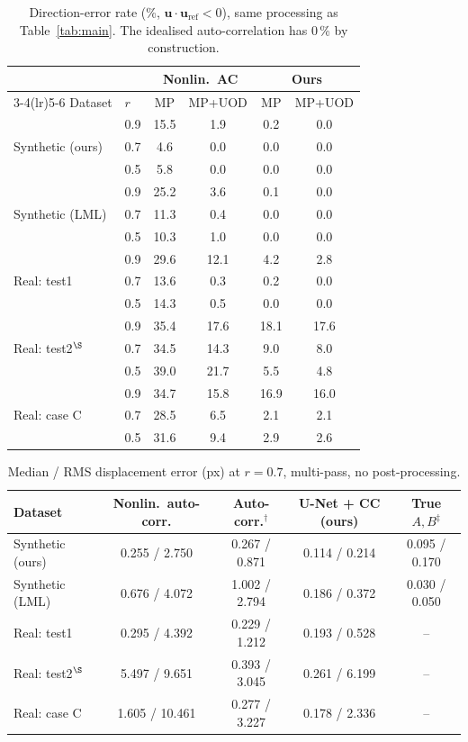 \begin{table}[t]
\centering
\caption{Direction-error rate (\%, $\mathbf{u}\cdot\mathbf{u}_\mathrm{ref}<0$), same processing as Table~\ref{tab:main}. The idealised auto-correlation has 0\,\% by construction.}
\label{tab:direction}
\small
\begin{tabular}{llcccc}
\toprule
 & & \multicolumn{2}{c}{Nonlin.\ AC} & \multicolumn{2}{c}{Ours} \\
\cmidrule(lr){3-4}\cmidrule(lr){5-6}
Dataset & $r$ & MP & MP+UOD & MP & MP+UOD \\
\midrule
\multirow{3}{*}{Synthetic (ours)} & 0.9 & 15.5 & 1.9 & 0.2 & 0.0 \\
 & 0.7 & 4.6 & 0.0 & 0.0 & 0.0 \\
 & 0.5 & 5.8 & 0.0 & 0.0 & 0.0 \\
\midrule
\multirow{3}{*}{Synthetic (LML)} & 0.9 & 25.2 & 3.6 & 0.1 & 0.0 \\
 & 0.7 & 11.3 & 0.4 & 0.0 & 0.0 \\
 & 0.5 & 10.3 & 1.0 & 0.0 & 0.0 \\
\midrule
\multirow{3}{*}{Real: test1} & 0.9 & 29.6 & 12.1 & 4.2 & 2.8 \\
 & 0.7 & 13.6 & 0.3 & 0.2 & 0.0 \\
 & 0.5 & 14.3 & 0.5 & 0.0 & 0.0 \\
\midrule
\multirow{3}{*}{Real: test2$^\S$} & 0.9 & 35.4 & 17.6 & 18.1 & 17.6 \\
 & 0.7 & 34.5 & 14.3 & 9.0 & 8.0 \\
 & 0.5 & 39.0 & 21.7 & 5.5 & 4.8 \\
\midrule
\multirow{3}{*}{Real: case C} & 0.9 & 34.7 & 15.8 & 16.9 & 16.0 \\
 & 0.7 & 28.5 & 6.5 & 2.1 & 2.1 \\
 & 0.5 & 31.6 & 9.4 & 2.9 & 2.6 \\
\bottomrule
\end{tabular}
\end{table}

\begin{table}[t]
\centering
\caption{Median / RMS displacement error (px) at $r=0.7$, multi-pass, no post-processing.}
\label{tab:accuracy}
\small
\begin{tabular}{lcccc}
\toprule
Dataset & Nonlin.\ auto-corr. & Auto-corr.$^\dagger$ & U-Net + CC (ours) & True $A,B$$^\ddagger$ \\
\midrule
Synthetic (ours) & 0.255 / 2.750 & 0.267 / 0.871 & 0.114 / 0.214 & 0.095 / 0.170 \\
Synthetic (LML) & 0.676 / 4.072 & 1.002 / 2.794 & 0.186 / 0.372 & 0.030 / 0.050 \\
Real: test1 & 0.295 / 4.392 & 0.229 / 1.212 & 0.193 / 0.528 & -- \\
Real: test2$^\S$ & 5.497 / 9.651 & 0.393 / 3.045 & 0.261 / 6.199 & -- \\
Real: case C & 1.605 / 10.461 & 0.277 / 3.227 & 0.178 / 2.336 & -- \\
\bottomrule
\end{tabular}
\end{table}

